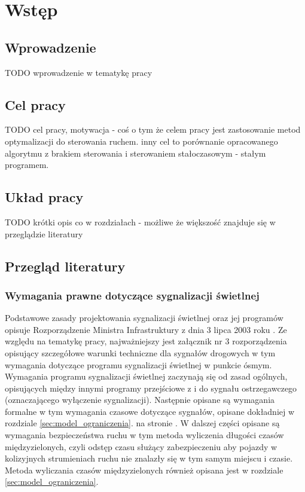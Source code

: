 \chapter{Wstęp}
\section{Wprowadzenie}
TODO wprowadzenie w tematykę pracy
\section{Cel pracy}
TODO cel pracy, motywacja - coś o tym że celem pracy jest zastosowanie metod optymalizacji do sterowania ruchem.
inny cel to porównanie opracowanego algorytmu z brakiem sterowania i sterowaniem stałoczasowym - stałym programem.
\section{Układ pracy}
TODO krótki opis co w rozdziałach - możliwe że większość znajduje się w przeglądzie literatury
\section{Przegląd literatury}
\subsection{Wymagania prawne dotyczące sygnalizacji świetlnej}
Podstawowe zasady projektowania sygnalizacji świetlnej oraz jej programów opisuje Rozporządzenie Ministra Infrastruktury z dnia 3 lipca 2003 roku \cite{rozporzadzenie}.
Ze względu na tematykę pracy, najważniejszy jest załącznik nr 3 rozporządzenia opisujący szczegółowe warunki techniczne dla sygnałów drogowych w tym wymagania dotyczące programu sygnalizacji świetlnej w punkcie ósmym.
Wymagania programu sygnalizacji świetlnej zaczynają się od zasad ogólnych, opisujących między innymi programy przejściowe z i do sygnału ostrzegawczego (oznaczającego wyłączenie sygnalizacji). Następnie opisane są wymagania formalne w tym wymagania czasowe dotyczące sygnałów, opisane dokładniej w rozdziale \ref{sec:model_ograniczenia}. na stronie \pageref{sec:model_ograniczenia}.
W dalszej części opisane są wymagania bezpieczeństwa ruchu w tym metoda wyliczenia długości czasów międzyzielonych, czyli odstęp czasu służący zabezpieczeniu aby pojazdy w kolizyjnych strumieniach ruchu nie znalazły się w tym samym miejscu i czasie. Metoda wyliczania czasów międzyzielonych również opisana jest w rozdziale \ref{sec:model_ograniczenia}.

